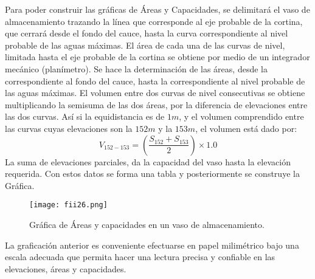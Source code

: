 Para poder construir las gráficas de Áreas y Capacidades, se
delimitará el vaso de almacenamiento trazando la línea que corresponde al eje
probable de la cortina, que cerrará desde el fondo del cauce, hasta la curva
correspondiente al nivel probable de las aguas máximas.
El área de cada una de las curvas de nivel, limitada hasta el eje probable de la
cortina se obtiene por medio de un integrador mecánico (planímetro). Se hace la
determinación de las áreas, desde la correspondiente al fondo del cauce, hasta la
correspondiente al nivel probable de las aguas máximas.
El volumen entre dos curvas de nivel consecutivas se obtiene multiplicando la
semisuma de las dos áreas, por la diferencia de elevaciones entre las dos curvas. Así
si la equidistancia es de $1m$, y el volumen comprendido entre las curvas cuyas
elevaciones son la $152m$ y la $153m$, el volumen está dado por:
\begin{equation}
	V_{152-153}= \left(\frac{S_{152}+S_{153}}{2} \right) \times 1{.}0
\end{equation}
La suma de elevaciones parciales, da la capacidad del vaso hasta la elevación
requerida. Con estos datos se forma una tabla y posteriormente se construye la
Gráfica.
\begin{figure}[h!]
	\centerline{\texttt{[image: fii26.png]}}
	\caption{Gráfica de Áreas y capacidades en un vaso de almacenamiento.}
	\label{fii26}
\end{figure}
La graficación anterior es conveniente efectuarse en papel milimétrico bajo una
escala adecuada que permita hacer una lectura precisa y confiable en las elevaciones,
áreas y capacidades.

